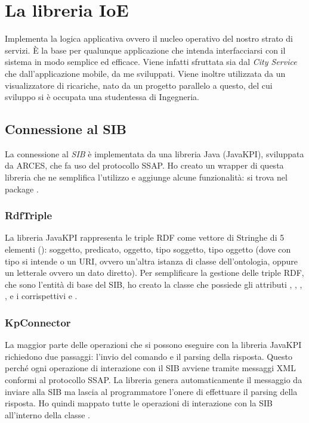 \section{La libreria IoE}\label{subsec:ioe-lib}

Implementa la logica applicativa ovvero il nucleo operativo del nostro strato di servizi. È la base per qualunque applicazione che intenda interfacciarsi con il sistema in modo semplice ed efficace. Viene infatti sfruttata sia dal \emph{City Service} che dall'applicazione mobile, da me sviluppati. Viene inoltre utilizzata da un visualizzatore di ricariche, nato da un progetto parallelo a questo, del cui sviluppo si è occupata una studentessa di Ingegneria.

\subsection{Connessione al SIB}

La connessione al \emph{SIB} è implementata da una libreria Java (JavaKPI), sviluppata da ARCES, che fa uso del protocollo SSAP. Ho creato un wrapper di questa libreria che ne semplifica l'utilizzo e aggiunge alcune funzionalità: si trova nel package .

\subsubsection{RdfTriple}

La libreria JavaKPI rappresenta le triple RDF come vettore di Stringhe di 5 elementi (): soggetto, predicato, oggetto, tipo soggetto, tipo oggetto (dove con tipo si intende o un URI, ovvero un'altra istanza di classe dell'ontologia, oppure un letterale ovvero un dato diretto). 
Per semplificare la gestione delle triple RDF, che sono l'entità di base del SIB, ho creato la classe  che possiede gli attributi , , , ,  e i corrispettivi  e .

\subsubsection{KpConnector}

La maggior parte delle operazioni che si possono eseguire con la libreria JavaKPI richiedono due passaggi: l'invio del comando e il parsing della risposta. Questo perché ogni operazione di interazione con il SIB avviene tramite messaggi XML conformi al protocollo SSAP. La libreria genera automaticamente il messaggio da inviare alla SIB ma lascia al programmatore l'onere di effettuare il parsing della risposta. Ho quindi mappato tutte le operazioni di interazione con la SIB all'interno della classe .

